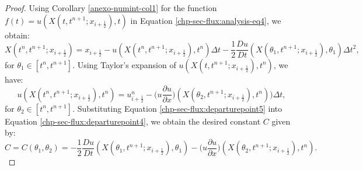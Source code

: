 \begin{proof}
	Using Corollary \ref{anexo-numint-col1} for the function $f(t) = u(X(t,t^{n+1};x_{i+\frac{1}{2}}),t)$ in Equation \eqref{chp-sec-flux:analysis-eq4}, we obtain:
	\begin{equation}
		\label{chp-sec-flux:departurepoint4}
		X(t^n,t^{n+1};x_{i+\frac{1}{2}}) = x_{i+\frac{1}{2}} - u(X(t^n,t^{n+1};x_{i+\frac{1}{2}}),t^n)\Delta t 
        - \frac{1}{2}\frac{Du}{Dt}(X(\theta_1,t^{n+1};x_{i+\frac{1}{2}}),\theta_1)\Delta t^2,
	\end{equation}
	for $\theta_1 \in [t^n, t^{n+1}]$.
	Using Taylor's expansion of $u(X(t,t^{n+1};x_{i+\frac{1}{2}}),t^n)$, we have:
	\begin{equation}
		\label{chp-sec-flux:departurepoint5}
		u(X(t^n,t^{n+1};x_{i+\frac{1}{2}}),t^n) = u^n_{i+\frac{1}{2}} - 
        \bigg(u\frac{\partial u}{\partial x}\bigg)(X(\theta_2,t^{n+1};x_{i+\frac{1}{2}}),t^n))\Delta t,
	\end{equation}
	for $\theta_2 \in [t^n, t^{n+1}]$.
	Substituting Equation \eqref{chp-sec-flux:departurepoint5} into Equation \eqref{chp-sec-flux:departurepoint4}, we obtain the desired constant $C$ given by:
	\begin{equation}
		\label{chp-sec-flux:departurepoint6}
		C = C(\theta_1, \theta_2) = -\frac{1}{2}\frac{Du}{Dt}(X(\theta_1,t^{n+1};x_{i+\frac{1}{2}}),\theta_1)
        - \bigg(u\frac{\partial u}{\partial x}\bigg)(X(\theta_2,t^{n+1};x_{i+\frac{1}{2}}),t^n).
	\end{equation}
\end{proof}
